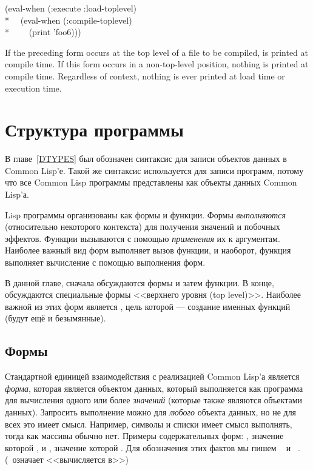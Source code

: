 \begin{newer}
\begin{defspec}
\begin{lisp}
(eval-when (:execute :load-toplevel) \\*
~~(eval-when (:compile-toplevel) \\*
~~~~(print 'foo6)))
\end{lisp}

    If the preceding form occurs at the top level of a file to be compiled,
        is
       printed at compile time.  If this form occurs in a non-top-level
       position, nothing is printed at compile time. Regardless of context,
       nothing is ever printed at load time or execution time.
\end{defspec}
\end{newer}

\else

\chapter{Структура программы}
\label{PROGS}

В главе~\ref{DTYPES} был обозначен синтаксис для записи объектов данных в Common
Lisp'е. Такой же синтаксис используется для записи программ, потому что все
Common Lisp программы представлены как объекты данных Common Lisp'а.

Lisp программы организованы как формы и функции. Формы \emph{выполняются}
(относительно некоторого контекста) для получения значений и побочных
эффектов. Функции вызываются с помощью \emph{применения} их к аргументам.
Наиболее важный вид форм выполняет вызов функции, и наоборот, функция выполняет
вычисление с помощью выполнения форм.

В данной главе, сначала обсуждаются формы и затем функции. В конце, обсуждаются
специальные формы <<верхнего уровня (top level)>>. Наиболее важной из этих форм
является , цель которой --- создание именных функций (будут
ещё и безымянные).

\section{Формы}

Стандартной единицей взаимодействия с реализацией Common Lisp'а является
\emph{форма}, которая является объектом данных, который выполняется как
программа для вычисления одного или более \emph{значений} (которые также
являются объектами данных). Запросить выполнение можно для \emph{любого}
объекта данных, но не для всех это имеет смысл. Например, символы и списки имеет
смысл выполнять, тогда как массивы обычно нет. Примеры содержательных форм:
, значение которой , и , значение которой .
Для обозначения этих фактов мы пишем  \EV\  и  \EV\
. (\EV\ означает <<вычисляется в>>)

